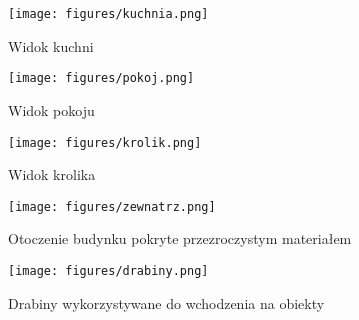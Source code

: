 \begin{figure}
\begin{center}
\texttt{[image: figures/kuchnia.png]}
\caption{Widok kuchni}
\label{kitchen}
\end{center}
\end{figure}

\begin{figure}
\begin{center}
\texttt{[image: figures/pokoj.png]}
\caption{Widok pokoju}
\label{room}
\end{center}
\end{figure}

\begin{figure}
\begin{center}
\texttt{[image: figures/krolik.png]}
\caption{Widok krolika}
\label{rabbit}
\end{center}
\end{figure}

\begin{figure}
\begin{center}
\texttt{[image: figures/zewnatrz.png]}
\caption{Otoczenie budynku pokryte przezroczystym materiałem}
\label{outdoor}
\end{center}
\end{figure}

\begin{figure}
\begin{center}
\texttt{[image: figures/drabiny.png]}
\caption{Drabiny wykorzystywane do wchodzenia na obiekty}
\label{ladders}
\end{center}
\end{figure}


